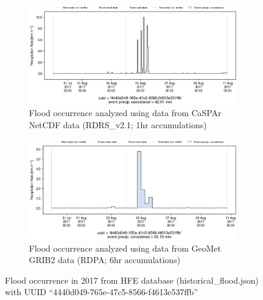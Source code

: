 \documentclass[10pt,a4paper,titlepage,parskip]{scrartcl}
\begin{document}
\begin{figure}[h]
	\begin{subfigure}[a]{1.0\textwidth}
		\centering
		\includegraphics[width=\linewidth]{figures/compare_Geomet_CaSPAr/interpolated_at_stations_occurrence_1059_identified-timesteps_RDRS_v2.1.png}
		\caption{Flood occurrence analyzed using data from CaSPAr NetCDF data (RDRS\_v2.1; 1hr accumulations)}
	\end{subfigure}
	\par\bigskip\bigskip
	\begin{subfigure}[b]{1.0\textwidth}
		\centering
		\includegraphics[width=\linewidth]{figures/compare_Geomet_CaSPAr/interpolated_at_stations_occurrence_1059_identified-timesteps_rdpa_10km_6f.png}
		\caption{Flood occurrence analyzed using data from GeoMet GRIB2 data (RDPA; 6hr accumulations)}
	\end{subfigure}
	\par\bigskip\bigskip
	\caption{Flood occurrence in 2017 from HFE database (historical\_flood.json) with UUID ``4440d049-765e-47c5-8566-f4613e537ffb''}
\end{figure}
\pagebreak
\end{document}
